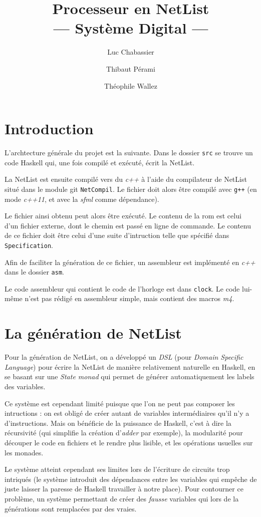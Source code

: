\documentclass{article}
\title{Processeur en NetList\\--- Système Digital ---}
\author{Luc Chabassier \and Thibaut Pérami \and Théophile Wallez}
\begin{document}
\maketitle

\section{Introduction}
L'archtecture générale du projet est la suivante. Dans le dossier \texttt{src}
se trouve un code Haskell qui, une fois compilé et exécuté, écrit la NetList.

La NetList est ensuite compilé vers du \emph{c++} à l'aide du compilateur de
NetList situé dans le module git \texttt{NetCompil}. Le fichier doit alors être
compilé avec \texttt{g++} (en mode \emph{c++11}, et avec la \emph{sfml} comme
dépendance).

Le fichier ainsi obtenu peut alors être exécuté. Le contenu de la rom est celui
d'un fichier externe, dont le chemin est passé en ligne de commande. Le contenu
de ce fichier doit être celui d'une suite d'intruction telle que spécifié dans
\texttt{Specification}.

Afin de faciliter la génération de ce fichier, un assembleur est implémenté en
\emph{c++} dans le dossier \texttt{asm}.

Le code assembleur qui contient le code de l'horloge est dans \texttt{clock}.
Le code lui-même n'est pas rédigé en assembleur simple, mais contient des
macros \emph{m4}.

\section{La génération de NetList}
Pour la génération de NetList, on a développé un \emph{DSL} (pour \emph{Domain
Specific Language}) pour écrire la NetList de manière relativement naturelle
en Haskell, en se basant sur une \emph{State monad} qui permet de générer
automatiquement les labels des variables.

Ce système est cependant limité puisque que l'on ne peut pas composer les
intructions : on est obligé de créer autant de variables intermédiaires qu'il
n'y a d'instructions. Mais on bénéficie de la puissance de Haskell, c'est à dire
la récursivité (qui simplifie la création d'\emph{adder} par exemple), la
modularité pour découper le code en fichiers et le rendre plus lisible, et les
opérations usuelles sur les monades.

Le système atteint cependant ses limites lors de l'écriture de circuits trop
intriqués (le système introduit des dépendances entre les variables qui empêche
de juste laisser la paresse de Haskell travailler à notre place). Pour
contourner ce problème, un système permettant de créer des \emph{fausse}
variables qui lors de la générations sont remplacées par des vraies.
\end{document}
